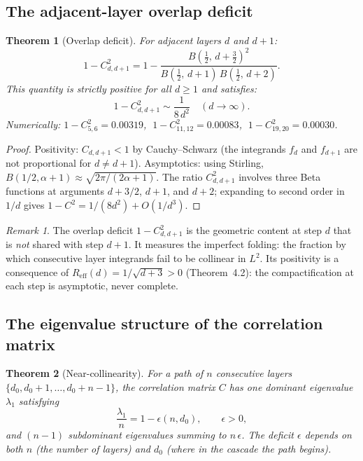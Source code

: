 \documentclass[12pt,a4paper]{article}
\newtheorem{theorem}{Theorem}[section]
\theoremstyle{remark}
\newtheorem*{remark}{Remark}
\begin{document}
\subsection{The adjacent-layer overlap deficit}

\begin{theorem}[Overlap deficit]\label{thm:overlap}
For adjacent layers $d$ and $d+1$:
\[
1 - C_{d,d+1}^2 = 1 - \frac{B\!\left(\frac{1}{2},\, d + \frac{3}{2}\right)^2}{B\!\left(\frac{1}{2},\, d+1\right)\, B\!\left(\frac{1}{2},\, d+2\right)}.
\]
This quantity is strictly positive for all $d \geq 1$ and satisfies:
\[
1 - C_{d,d+1}^2 \sim \frac{1}{8\, d^2} \quad (d \to \infty).
\]
Numerically: $1 - C_{5,6}^2 = 0.00319$, $\; 1 - C_{11,12}^2 = 0.00083$, $\; 1 - C_{19,20}^2 = 0.00030$.
\end{theorem}

\begin{proof}
Positivity: $C_{d,d+1} < 1$ by Cauchy--Schwarz (the integrands $f_d$ and $f_{d+1}$ are not proportional for $d \neq d+1$). Asymptotics: using Stirling, $B(1/2, \alpha+1) \approx \sqrt{2\pi/(2\alpha+1)}$. The ratio $C_{d,d+1}^2$ involves three Beta functions at arguments $d+3/2$, $d+1$, and $d+2$; expanding to second order in $1/d$ gives $1 - C^2 = 1/(8d^2) + O(1/d^3)$.
\end{proof}

\begin{remark}
The overlap deficit $1 - C_{d,d+1}^2$ is the geometric content at step $d$ that is \emph{not} shared with step $d+1$. It measures the imperfect folding: the fraction by which consecutive layer integrands fail to be collinear in $L^2$. Its positivity is a consequence of $R_{\mathrm{eff}}(d) = 1/\sqrt{d+3} > 0$ (Theorem~4.2): the compactification at each step is asymptotic, never complete.
\end{remark}

\subsection{The eigenvalue structure of the correlation matrix}

\begin{theorem}[Near-collinearity]\label{thm:eigenvalue}
For a path of $n$ consecutive layers $\{d_0, d_0+1, \ldots, d_0+n-1\}$, the correlation matrix $C$ has one dominant eigenvalue $\lambda_1$ satisfying
\[
\frac{\lambda_1}{n} = 1 - \epsilon(n, d_0), \qquad \epsilon > 0,
\]
and $(n - 1)$ subdominant eigenvalues summing to $n\,\epsilon$. The deficit $\epsilon$ depends on both $n$ (the number of layers) and $d_0$ (where in the cascade the path begins).
\end{theorem}
\end{document}
